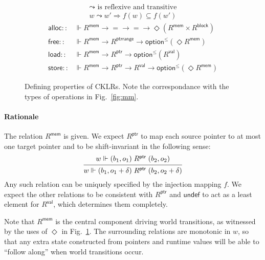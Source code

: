 \documentclass[draft,11pt]{report}
\newcommand{\kw}[1]{\ensuremath{ \mathsf{#1} }}
\begin{document}
\begin{figure} %
  \begin{gather*}
    {\leadsto} \mbox{ is reflexive and transitive} \\
    w \leadsto w' \Rightarrow f(w) \subseteq f(w')
  \end{gather*}
  \begin{align*}
      \kw{alloc} ::
        &\Vdash R^\kw{mem} \rightarrow {=} \rightarrow {=} \rightarrow
        \Diamond (R^\kw{mem} \times R^\kw{block})
      \\
      \kw{free} ::
        &\Vdash R^\kw{mem} \rightarrow R^\kw{ptrrange} \rightarrow
        \kw{option}^\le(\Diamond R^\kw{mem})
      \\
      \kw{load} ::
        &\Vdash R^\kw{mem} \rightarrow R^\kw{ptr} \rightarrow
        \kw{option}^\le(R^\kw{val})
      \\
      \kw{store} ::
        &\Vdash R^\kw{mem} \rightarrow R^\kw{ptr} \rightarrow R^\kw{val} \rightarrow
        \kw{option}^\le(\Diamond R^\kw{mem})
  \end{align*}
  \caption{Defining properties of CKLRs.
    Note the correspondance with
    the types of operations in Fig.~\ref{fig:mm}.}
  \label{fig:cklr-def}
\end{figure}

\paragraph{Rationale} %

The relation $R^\kw{mem}$ is given.
We expect $R^\kw{ptr}$ to map
each source pointer to at most one target pointer
and to be shift-invariant in the following sense:
\[
  \begin{prooftree}
    \hypo{w \Vdash (b_1, o_1) \mathrel{R^\kw{ptr}} (b_2, o_2)}
    \infer1{
      w \Vdash (b_1, o_1 + \delta) \mathrel{R^\kw{ptr}} (b_2, o_2 + \delta)}
  \end{prooftree}
\]
Any such relation can be uniquely specified by
the injection mapping $f$.
We expect the other relations to be consistent with $R^\kw{ptr}$
and $\kw{undef}$ to act as a least element for $R^\kw{val}$,
which determines them completely.


Note that $R^\kw{mem}$
is the central component driving world transitions,
as witnessed by the uses of $\Diamond$ in Fig.~\ref{fig:cklr-def}.
The surrounding relations are monotonic in $w$,
so that any extra state
constructed from pointers and runtime values
will be able to ``follow along'' when
world transitions occur.
\end{document}
